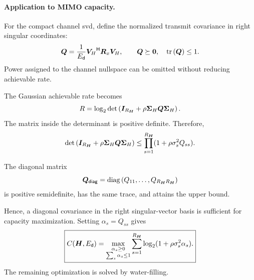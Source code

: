 \paragraph{Application to MIMO capacity.}
For the compact channel \ac{svd}, define the
normalized transmit covariance in right singular
coordinates:
\begin{equation*}
	\bm{Q}
	=\frac{1}{E_{\mathsf{d}}}
	{\bm{V}_{H}}^{\mathsf{H}}\bm{R}_x\bm{V}_{H},
	\qquad
	\bm{Q}\succeq\bm{0},
	\quad \operatorname{tr}\left(\bm{Q}\right)\leq1.
\end{equation*}
Power assigned to the channel nullspace can
be omitted without reducing achievable rate.

The Gaussian achievable rate becomes
\begin{equation*}
	R
	=\log_2\operatorname{det}\left(
		\bm{I}_{R_{\bm{H}}}
		+\rho\bm{\Sigma}_{H}
		\bm{Q}\bm{\Sigma}_{H}
	\right).
\end{equation*}
The matrix inside the determinant is positive
definite. Therefore,
\begin{equation*}
	\operatorname{det}\left(
		\bm{I}_{R_{\bm{H}}}
		+\rho\bm{\Sigma}_{H}
		\bm{Q}\bm{\Sigma}_{H}
	\right)
	\leq
	\prod_{s=1}^{R_{\bm{H}}}
	(1+\rho\sigma_s^2Q_{ss}).
\end{equation*}

The diagonal matrix
\begin{equation*}
	\bm{Q}_{\mathsf{diag}}
	=\operatorname{diag}\left(Q_{11},\ldots,Q_{R_{\bm{H}}R_{\bm{H}}}\right)
\end{equation*}
is positive semidefinite, has the same trace,
and attains the upper bound.

Hence, a diagonal covariance in the right
singular-vector basis is sufficient for capacity
maximization. Setting $\alpha_s=Q_{ss}$ gives
\begin{equation}\label{eq:app-capacity}
	\boxed{
		C(\bm{H},E_{\mathsf{d}})
		=
		\max_{\substack{\alpha_s\geq0\\
				\sum_s\alpha_s\leq1}}
		\sum_{s=1}^{R_{\bm{H}}}
		\log_2(1+\rho\sigma_s^2\alpha_s).
	}
\end{equation}
The remaining optimization is solved
by water-filling.




